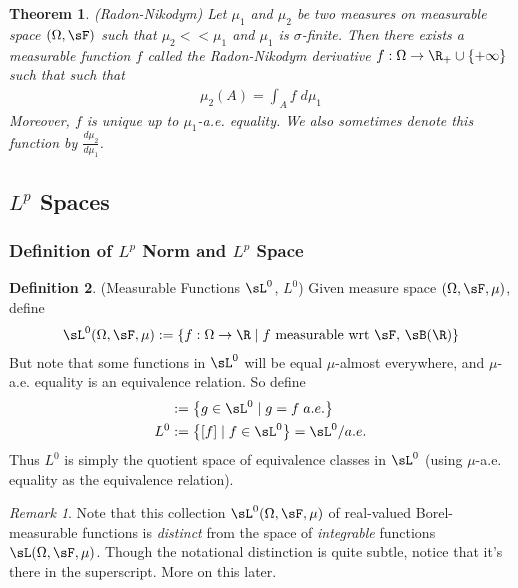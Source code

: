\documentclass[12pt]{article}
\theoremstyle{plain}
\newtheorem{thm}{Theorem}[section]
\theoremstyle{definition}
\newtheorem{defn}[thm]{Definition}
\theoremstyle{remark}
\newtheorem*{rmk}{Remark}
\newcommand{\ra}{\rightarrow}
\begin{document}
\begin{thm}(Radon-Nikodym)
Let $\mu_1$ and $\mu_2$ be two measures on measurable space
$(\Omega,\sF)$ such that $\mu_2<<\mu_1$ and $\mu_1$ is $\sigma$-finite.
Then there exists a measurable function $f$ called the
\emph{Radon-Nikodym derivative}
$f:\Omega\ra \R_+\cup \{+\infty\}$ such that
such that
\begin{align*}
  \mu_2(A) = \int_A f \; d\mu_1
\end{align*}
Moreover, $f$ is unique up to $\mu_1$-a.e. equality. We also sometimes
denote this function by $\frac{d\mu_2}{d\mu_1}$.
\end{thm}


\clearpage
\subsection{$L^p$ Spaces}

\subsubsection{Definition of $L^p$ Norm and $L^p$ Space}

\begin{defn}(Measurable Functions $\sL^0$, $L^0$)
Given measure space $(\Omega,\sF,\mu)$, define
\begin{align*}
  \sL^0(\Omega,\sF,\mu) :=
  \left\{ f:\Omega\ra\R \; |\; \text{$f$ measurable wrt $\sF$, $\sB(\R)$} \right\}
\end{align*}
But note that some functions in $\sL^0$ will be equal $\mu$-almost
everywhere, and $\mu$-a.e. equality is an equivalence relation. So
define
\begin{align*}
  [f] &:= \left\{ g\in \sL^0 \;|\; g=f \; a.e. \right\} \\
  L^0 &:= \left\{ [f] \;|\; f\in\sL^0 \right\}
  = \sL^0 / a.e.
\end{align*}
Thus $L^0$ is simply the quotient space of equivalence classes in
$\sL^0$ (using $\mu$-a.e. equality as the equivalence relation).
\end{defn}

\begin{rmk}
Note that this collection $\sL^0(\Omega,\sF,\mu)$ of real-valued
Borel-measurable functions is \emph{distinct} from the space of
\emph{integrable} functions $\sL(\Omega,\sF,\mu)$.
Though the notational distinction is quite subtle, notice that it's
there in the superscript. More on this later.
\end{rmk}
\end{document}
